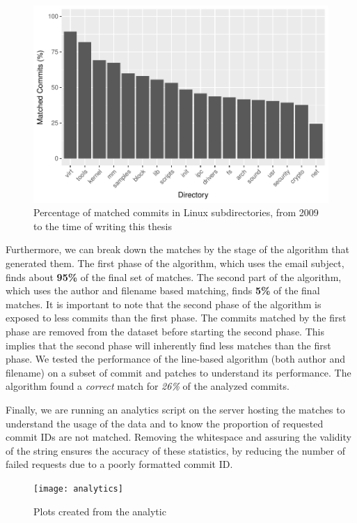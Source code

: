\begin{figure}[htb]
\centering
\includegraphics[width=5in]{plots/matched_commits_dir}
\caption{Percentage of matched commits in Linux subdirectories, from 2009 to the time of writing this thesis}
\label{fig:matched_proportions}
\end{figure}

Furthermore, we can break down the matches by the stage of the algorithm that generated them. The first phase of the algorithm, which uses the email subject, finds about \textbf{95\%} of the final set of matches. The second part of the algorithm, which uses the author and filename based matching, finds \textbf{5\%} of the final matches. It is important to note that the second phase of the algorithm is exposed to less commits than the first phase. The commits matched by the first phase are removed from the dataset before starting the second phase. This implies that the second phase will inherently find less matches than the first phase. We tested the performance of the line-based algorithm (both author and filename) on a subset of commit and patches to understand its performance. The algorithm found a \textit{correct} match for \textit{26\%} of the analyzed commits.



Finally, we are running an analytics script on the server hosting the matches to understand the usage of the data and to know the proportion of requested commit IDs are not matched. Removing the whitespace and assuring the validity of the string ensures the accuracy of these statistics, by reducing the number of failed requests due to a poorly formatted commit ID.

\begin{figure}[htb]
\centering
\texttt{[image: analytics]}
\caption{Plots created from the analytic}
\label{fig:analytics}
\end{figure}

